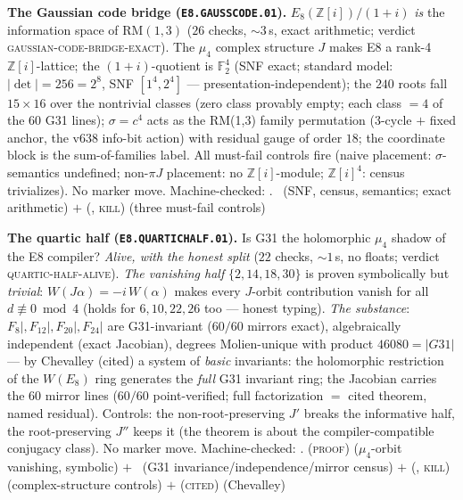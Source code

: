 \par\smallskip\noindent\textbf{The Gaussian code bridge
(\texttt{E8.GAUSSCODE.01}).}
$E_8(\mathbb{Z}[i])/(1+i)$ \emph{is} the information space of
$\mathrm{RM}(1,3)$ ($26$ checks, ${\sim}3$\,s, exact arithmetic;
verdict \textsc{gaussian-code-bridge-exact}).  The $\mu_4$ complex
structure $J$ makes E8 a rank-4 $\mathbb{Z}[i]$-lattice; the
$(1+i)$-quotient is $\mathbb{F}_2^4$ (SNF exact; standard model:
$|\det|=256=2^8$, SNF $[1^4,2^4]$ --- presentation-independent);
the $240$ roots fall $15\times16$ over the nontrivial classes (zero
class provably empty; each class $=4$ of the $60$ G31 lines);
$\sigma=c^4$ acts as the RM(1,3) family permutation (3-cycle $+$
fixed anchor, the v638 info-bit action) with residual gauge of order
$18$; the coordinate block is the sum-of-families label.  All
must-fail controls fire (naive placement: $\sigma$-semantics
undefined; non-$\pi J$ placement: no $\mathbb{Z}[i]$-module;
$\mathbb{Z}[i]^4$: census trivializes).  No marker move.
Machine-checked: .
\mE\ (SNF, census, semantics; exact arithmetic) $+$ (\mE,
\textsc{kill}) (three must-fail controls)
\par\smallskip

\par\smallskip\noindent\textbf{The quartic half
(\texttt{E8.QUARTICHALF.01}).}
Is G31 the holomorphic $\mu_4$ shadow of the E8 compiler?
\emph{Alive, with the honest split} ($22$ checks, ${\sim}1$\,s, no
floats; verdict \textsc{quartic-half-alive}).  \emph{The vanishing
half} $\{2,14,18,30\}$ is proven symbolically but \emph{trivial}:
$W(J\alpha)=-i\,W(\alpha)$ makes every $J$-orbit contribution vanish
for all $d\not\equiv0\bmod4$ (holds for $6,10,22,26$ too --- honest
typing).  \emph{The substance}: $F_8|,F_{12}|,F_{20}|,F_{24}|$ are
G31-invariant ($60/60$ mirrors exact), algebraically independent
(exact Jacobian), degrees Molien-unique with product
$46080=|G31|$ --- by Chevalley (cited) a system of \emph{basic}
invariants: the holomorphic restriction of the $W(E_8)$ ring
generates the \emph{full} G31 invariant ring; the Jacobian carries
the $60$ mirror lines ($60/60$ point-verified; full factorization
$=$ cited theorem, named residual).  Controls: the non-root-preserving
$J'$ breaks the informative half, the root-preserving $J''$ keeps it
(the theorem is about the compiler-compatible conjugacy class).  No
marker move.
Machine-checked: .
(\textsc{proof}) ($\mu_4$-orbit vanishing, symbolic) $+$ \mE\ (G31
invariance/independence/mirror census) $+$ (\mE, \textsc{kill})
(complex-structure controls) $+$ (\textsc{cited}) (Chevalley)
\par\smallskip

